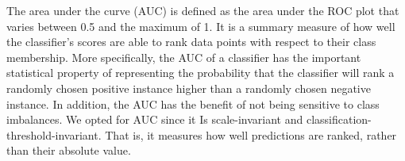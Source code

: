 The area under the curve (AUC) is defined as the area under the ROC plot that varies between 0.5 and the maximum of 1. It is a summary measure of how well the classifier's scores are able to rank data points with respect to their class membership. More specifically, the AUC of a classifier has the important statistical property of representing the probability that the classifier will rank a randomly chosen positive instance higher than a randomly chosen negative instance. In addition, the AUC has the benefit of not being sensitive to class imbalances. We opted for AUC since it Is scale-invariant and classification-threshold-invariant. That is, it measures how well predictions are ranked, rather than their absolute value. 

